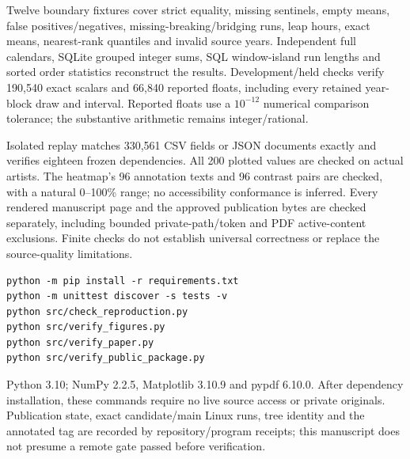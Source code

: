 \documentclass[10pt,letterpaper]{article}
\begin{document}
Twelve boundary fixtures cover strict equality, missing sentinels, empty means, false positives/negatives, missing-breaking/bridging runs, leap hours, exact means, nearest-rank quantiles and invalid source years. Independent full calendars, SQLite grouped integer sums, SQL window-island run lengths and sorted order statistics reconstruct the results. Development/held checks verify 190,540 exact scalars and 66,840 reported floats, including every retained year-block draw and interval. Reported floats use a $10^{-12}$ numerical comparison tolerance; the substantive arithmetic remains integer/rational.

Isolated replay matches 330,561 CSV fields or JSON documents exactly and verifies eighteen frozen dependencies. All 200 plotted values are checked on actual artists. The heatmap's 96 annotation texts and 96 contrast pairs are checked, with a natural 0--100\% range; no accessibility conformance is inferred. Every rendered manuscript page and the approved publication bytes are checked separately, including bounded private-path/token and PDF active-content exclusions. Finite checks do not establish universal correctness or replace the source-quality limitations.

\begin{verbatim}
python -m pip install -r requirements.txt
python -m unittest discover -s tests -v
python src/check_reproduction.py
python src/verify_figures.py
python src/verify_paper.py
python src/verify_public_package.py
\end{verbatim}
Python 3.10; NumPy 2.2.5, Matplotlib 3.10.9 and pypdf 6.10.0. After dependency installation, these commands require no live source access or private originals. Publication state, exact candidate/main Linux runs, tree identity and the annotated tag are recorded by repository/program receipts; this manuscript does not presume a remote gate passed before verification.
\end{document}
